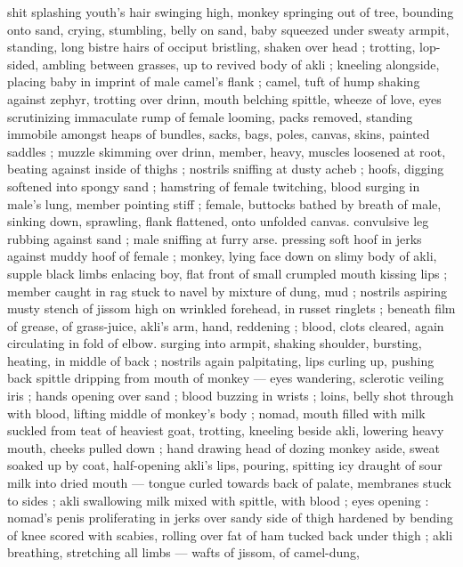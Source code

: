 {shit splashing youth's hair swinging high, monkey springing out of 
tree, bounding onto sand, crying, stumbling, belly on sand, baby 
squeezed under sweaty armpit, standing, long bistre hairs of occiput 
bristling, shaken over head ; trotting, lop-sided, ambling between 
grasses, up to revived body of akli ; kneeling alongside, placing baby 
in imprint of male camel's flank ; camel, tuft of hump shaking against 
zephyr, trotting over drinn, mouth belching spittle, wheeze of love, 
eyes scrutinizing immaculate rump of female looming, packs 
removed, standing immobile amongst heaps of bundles, sacks, bags, 
poles, canvas, skins, painted saddles ; muzzle skimming over drinn, 
member, heavy, muscles loosened at root, beating against inside of 
thighs ; nostrils sniffing at dusty acheb ; hoofs, digging softened into 
spongy sand ; hamstring of female twitching, blood surging in male's 
lung, member pointing stiff ; female, buttocks bathed by breath of 
male, sinking down, sprawling, flank flattened, onto unfolded canvas. 
convulsive leg rubbing against sand ; male sniffing at furry arse. 
pressing soft hoof in jerks against muddy hoof of female ; monkey, 
lying face down on slimy body of akli, supple black limbs enlacing 
boy, flat front of small crumpled mouth kissing lips ; member caught 
in rag stuck to navel by mixture of dung, mud ; nostrils aspiring 
musty stench of jissom high on wrinkled forehead, in russet ringlets 
; beneath film of grease, of grass-juice, akli's arm, hand, reddening 
; blood, clots cleared, again circulating in fold of elbow. surging into 
armpit, shaking shoulder, bursting, heating, in middle of back ; 
nostrils again palpitating, lips curling up, pushing back spittle 
dripping from mouth of monkey --- eyes wandering, sclerotic veiling 
iris ; hands opening over sand ; blood buzzing in wrists ; loins, belly 
shot through with blood, lifting middle of monkey's body ; nomad, 
mouth filled with milk suckled from teat of heaviest goat, trotting, 
kneeling beside akli, lowering heavy mouth, cheeks pulled down ; 
hand drawing head of dozing monkey aside, sweat soaked up by 
coat, half-opening akli's lips, pouring, spitting icy draught of sour 
milk into dried mouth --- tongue curled towards back of palate, 
membranes stuck to sides ; akli swallowing milk mixed with spittle, 
with blood ; eyes opening : nomad's penis proliferating in jerks over 
sandy side of thigh hardened by bending of knee scored with 
scabies, rolling over fat of ham tucked back under thigh ; akli 
breathing, stretching all limbs --- wafts of jissom, of camel-dung, 
}
